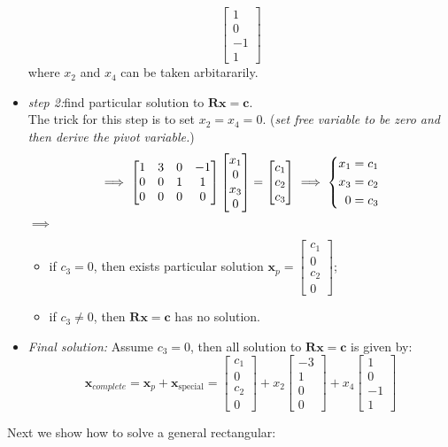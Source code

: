 \begin{example}
\begin{itemize}
\[\begin{bmatrix}
1\\0\\-1\\1
\end{bmatrix}
\]
where $x_2$ and $x_4$ can be taken arbitararily.
\item
\emph{step 2:}find particular solution to $\bm{Rx} = \bm c$.\\
The trick for this step is to set $x_2=x_4=0$. (\textit{set free variable to be zero and then derive the pivot variable.})\\
\[
\implies \begin{bmatrix}
1&3&0&-1\\0&0&1&1\\0&0&0&0
\end{bmatrix}\begin{bmatrix}
x_1\\0\\x_3\\0
\end{bmatrix} = \begin{bmatrix}
c_1\\c_2\\c_3
\end{bmatrix}
\implies
\left\{\begin{rgathered}
x_1 =c_1\\
x_3 =c_2\\
0 =c_3
\end{rgathered}\right.
\]
$\implies$ 
\begin{itemize}
\item
if $c_3 = 0$, then exists particular solution $\bm x_p = \begin{bmatrix}
c_1\\0\\c_2\\0
\end{bmatrix}$;
\item
if $c_3\ne 0$, then $\bm{Rx} = \bm c$ has no solution.
\end{itemize}
\item
\emph{Final solution:} Assume $c_3= 0$, then all solution to $\bm{Rx} = \bm c$ is given by:
\[
\bm x_{complete} = \bm x_p + \bm x_{\text{special}} = 
\begin{bmatrix}
c_1\\0\\c_2\\0
\end{bmatrix} + x_2\begin{bmatrix}
-3\\1\\0\\0
\end{bmatrix} + x_4\begin{bmatrix}
1\\0\\-1\\1
\end{bmatrix}
\]
\end{itemize}
\end{example}
Next we show how to solve a general rectangular:
\newpage
